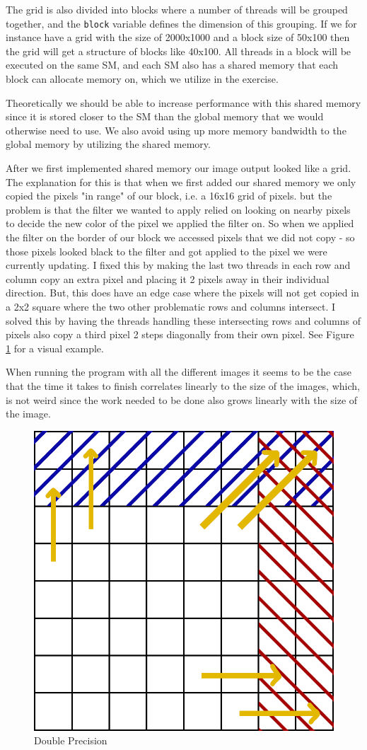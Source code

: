 \documentclass[a4paper, 12pt]{article}
\def\code#1{\texttt{#1}}
\def\f#1{Figure \ref{fig:#1}}
\begin{document}
The grid is also divided into blocks where a number of threads will be grouped together, and the \code{block} variable defines the dimension of this grouping. If we for instance have a grid with the size of 2000x1000 and a block size of 50x100 then the grid will get a structure of blocks like 40x100. All threads in a block will be executed on the same SM, and each SM also has a shared memory that each block can allocate memory on, which we utilize in the exercise.

Theoretically we should be able to increase performance with this shared memory since it is stored closer to the SM than the global memory that we would otherwise need to use. We also avoid using up more memory bandwidth to the global memory by utilizing the shared memory.

After we first implemented shared memory our image output looked like a grid. The explanation for this is that when we first added our shared memory we only copied the pixels "in range" of our block, i.e. a 16x16 grid of pixels. but the problem is that the filter we wanted to apply relied on looking on nearby pixels to decide the new color of the pixel we applied the filter on. So when we applied the filter on the border of our block we accessed pixels that we did not copy - so those pixels looked black to the filter and got applied to the pixel we were currently updating. I fixed this by making the last two threads in each row and column copy an extra pixel and placing it 2 pixels away in their individual direction. But, this does have an edge case where the pixels will not get copied in a 2x2 square where the two other problematic rows and columns intersect. I solved this by having the threads handling these intersecting rows and columns of pixels also copy a third pixel 2 steps diagonally from their own pixel. See \f{shared_memory} for a visual example.

When running the program with all the different images it seems to be the case that the time it takes to finish correlates linearly to the size of the images, which, is not weird since the work needed to be done also grows linearly with the size of the image.

\begin{figure}
    \centering
    \includegraphics[width=0.5\linewidth]{images/shared_memory.png}
    \caption{Double Precision}
    \label{fig:shared_memory}
\end{figure}
\end{document}
